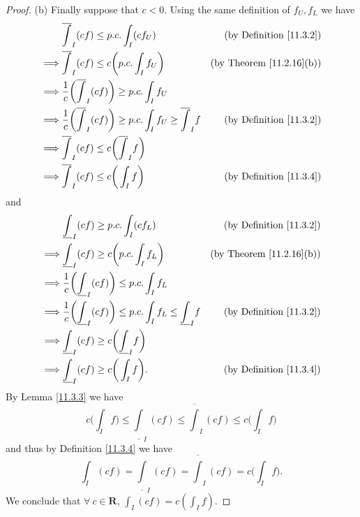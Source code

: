 \begin{proof}{(b)}
    Finally suppose that \(c < 0\).
    Using the same definition of \(f_U, f_L\) we have
    \begin{align*}
                 & \overline{\int}_I (cf) \leq p.c. \int_I (c f_U)                                              & \text{(by Definition \ref{11.3.2})}  \\
        \implies & \overline{\int}_I (cf) \leq c \bigg(p.c. \int_I f_U\bigg)                                    & \text{(by Theorem \ref{11.2.16}(b))} \\
        \implies & \frac{1}{c} \bigg(\overline{\int}_I (cf)\bigg) \geq p.c. \int_I f_U                                                                 \\
        \implies & \frac{1}{c} \bigg(\overline{\int}_I (cf)\bigg) \geq p.c. \int_I f_U \geq \overline{\int}_I f & \text{(by Definition \ref{11.3.2})}  \\
        \implies & \overline{\int}_I (cf) \leq c\bigg(\overline{\int}_I f\bigg)                                                                        \\
        \implies & \overline{\int}_I (cf) \leq c\bigg(\int_I f\bigg)                                            & \text{(by Definition \ref{11.3.4})}
    \end{align*}
    and
    \begin{align*}
                 & \underline{\int}_I (cf) \geq p.c. \int_I (c f_L)                                               & \text{(by Definition \ref{11.3.2})}  \\
        \implies & \underline{\int}_I (cf) \geq c \bigg(p.c. \int_I f_L\bigg)                                     & \text{(by Theorem \ref{11.2.16}(b))} \\
        \implies & \frac{1}{c} \bigg(\underline{\int}_I (cf)\bigg) \leq p.c. \int_I f_L                                                                  \\
        \implies & \frac{1}{c} \bigg(\underline{\int}_I (cf)\bigg) \leq p.c. \int_I f_L \leq \underline{\int}_I f & \text{(by Definition \ref{11.3.2})}  \\
        \implies & \underline{\int}_I (cf) \geq c\bigg(\underline{\int}_I f\bigg)                                                                        \\
        \implies & \underline{\int}_I (cf) \geq c\bigg(\int_I f\bigg).                                            & \text{(by Definition \ref{11.3.4})}
    \end{align*}
    By Lemma \ref{11.3.3} we have
    \[
        c\bigg(\int_I f\bigg) \leq \underline{\int}_I (cf) \leq \overline{\int}_I (cf) \leq c\bigg(\int_I f\bigg)
    \]
    and thus by Definition \ref{11.3.4} we have
    \[
        \int_I (cf) = \underline{\int}_I (cf) = \overline{\int}_I (cf) = c\bigg(\int_I f\bigg).
    \]
    We conclude that \(\forall\ c \in \mathbf{R}\), \(\int_I (cf) = c (\int_I f)\).
\end{proof}

